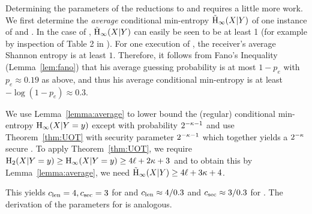Determining the parameters of the reductions to \GOT and \BUOT requires
a little more work. We first determine the \emph{average} conditional
min-entropy $\tH_{\infty}(X|Y)$ of one instance of \GOT and \BUOT. In
the case of \GOT, $\tH_{\infty}(X|Y)$ can easily be seen to be at
least 1 (for example by inspection of Table 2 in \cite{BCW03}). For
one execution of \BUOT, the receiver's average Shannon entropy is at
least $1$. Therefore, it follows from Fano's Inequality
(Lemma~\ref{lem:fano}) that his average guessing probability is at
most $1 - p_e$ with $p_e \approx 0.19$ as above, and thus his average
conditional min-entropy is at least $-\log (1-p_e) \approx
0.3$.

We use Lemma~\ref{lemma:average} to lower bound the (regular)
conditional min-entropy $\hmin(X|Y=y)$ except with probability
$2^{-\sp-1}$ and use Theorem~\ref{thm:UOT} with security parameter
$2^{-\sp-1}$ which together yields a $2^{-\sp}$ secure \RandlStringOT.
To apply Theorem~\ref{thm:UOT}, we require $\H_2(X|Y=y) \geq
\hmin(X|Y=y) \geq 4 \ell + 2 \sp + 3$ and to obtain this by
Lemma~\ref{lemma:average}, we need $\tH_{\infty}(X|Y) \geq 4 \ell + 3
\sp + 4$.

This yields $\cl=4, \ck=3$ for \GOT and $\cl \approx 4/0.3$ and $\ck
\approx 3/0.3$ for \BUOT. The derivation of the parameters for \cite{Wullschleger07} is analogous.









